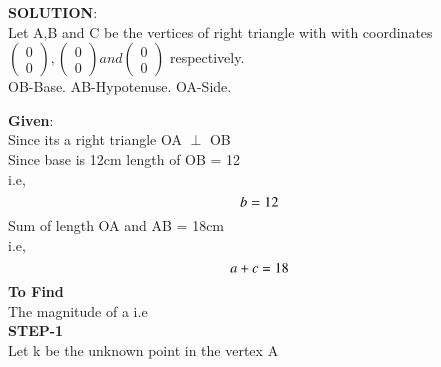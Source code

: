\documentclass[10pt,a4paper]{report}
\begin{document}
\begin{multicols}{2}
	\iffalse
\vspace{5mm}
\raggedright \textbf{SOLUTION}:\vspace{2mm}\\
Let A,B and C be the vertices of right triangle with with coordinates $\begin{pmatrix}
0 \\
0 
\end{pmatrix} 
, \begin{pmatrix}
0 \\
0 
\end{pmatrix} 
 and \begin{pmatrix}
0 \\
0 
\end{pmatrix} $
\vspace{1mm} respectively.\vspace{2mm}\\
OB-Base.
AB-Hypotenuse.
OA-Side.\\\vspace{2mm}
\raggedright \textbf{Given}:\vspace{2mm}\\
Since its a right triangle OA $\perp$ OB \\\vspace{2mm}
Since base is 12cm length of OB = 12  \\i.e,\\
\begin{equation}
b= 12 \vspace{2mm}
\end{equation}
Sum of length OA and AB = 18cm \\ i.e,\\
\begin{equation}
a + c= 18 \vspace{2mm}
\end{equation}
\textbf{To Find}\vspace{2mm}\\
The magnitude of a \hspace{2mm} i.e \\ \vspace{2mm}
\textbf{STEP-1}\vspace{2mm}\\
Let k be the unknown point in the vertex A \vspace{2mm}\\

\end{multicols}
\end{document}
